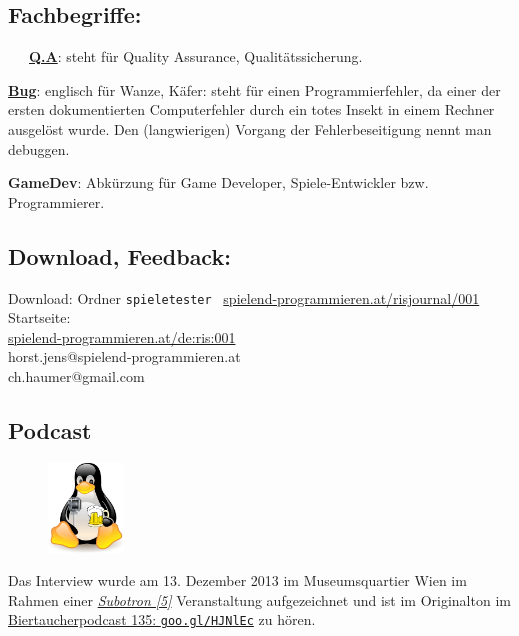 \documentclass[10pt,a4paper,ngerman,twoside]{article} %
\begin{document}
\begin{multicols}{3}
\subsection*{Fachbegriffe:}
~~~\href{https://de.wikipedia.org/wiki/Quality_Assurance}{\textbf{Q.A}}: steht für Quality Assurance,  Qualitätssicherung.

\href{https://de.wikipedia.org/wiki/Programmfehler}{\textbf{Bug}}: englisch für Wanze, Käfer: steht für einen Programmierfehler, da einer der ersten dokumentierten Computerfehler durch ein totes Insekt in einem Rechner ausgelöst wurde. Den (langwierigen) Vorgang der Fehlerbeseitigung nennt man debuggen.
 
\textbf{GameDev}: Abkürzung für Game Developer, Spiele-Entwickler bzw. Programmierer.

\subsection*{Download, Feedback:}
\footnotesize{
Download: Ordner \texttt{spieletester} \Mundus\ \href{http://spielend-programmieren.at/risjournal/001}{spielend-programmieren.at/risjournal/001}\\
Startseite:\\
\href{http://spielend-programmieren.at/de:ris:001}{spielend-programmieren.at/de:ris:001}\\ 
\Letter\: horst.jens@spielend-programmieren.at\\
\Letter\: ch.haumer@gmail.com\\}
\normalsize 

\subsection*{Podcast}
\begin{figure}
\includegraphics[width=2cm]{nomad/biertaucherlogo.png}
\end{figure}
Das Interview wurde am 13. Dezember 2013 im Museumsquartier Wien im Rahmen einer \href{http://subotron.com/}{\textit{Subotron [5]}} Veranstaltung aufgezeichnet und ist im Originalton im \href{http://spielend-programmieren.at/de:podcast:biertaucher:2013:135}{Biertaucherpodcast 135: \texttt{goo.gl/HJNlEc}} zu hören.


\end{multicols}
\end{document}
